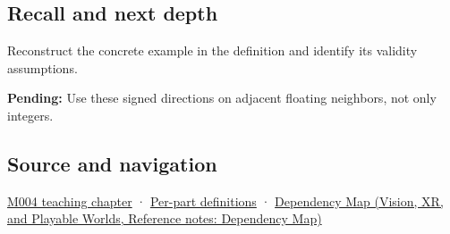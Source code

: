 \subsection{Recall and next depth}\label{appendix-637d164ae5ca-recall-and-next-depth}

\hypertarget{appendix-637d164ae5ca-recall-and-next-depth}{}

Reconstruct the concrete example in the definition and identify its validity assumptions.

\textbf{Pending:} Use these signed directions on adjacent floating neighbors, not only integers.

\subsection{Source and navigation}\label{appendix-637d164ae5ca-source-and-navigation}

\hypertarget{appendix-637d164ae5ca-source-and-navigation}{}

\hyperref[01-foundations-i-ch001-a-stretching-ruler-for-real-valued-quantities]{M004 teaching chapter} · \hyperref[appendix-fd090d982a15-m004---parts-61-76]{Per-part definitions} · \href{../07-Vision-XR-and-Playable-Worlds/main.pdf\#nameddest=appendix-4ad47bdd269a}{Dependency Map (Vision, XR, and Playable Worlds, Reference notes: Dependency Map)}
